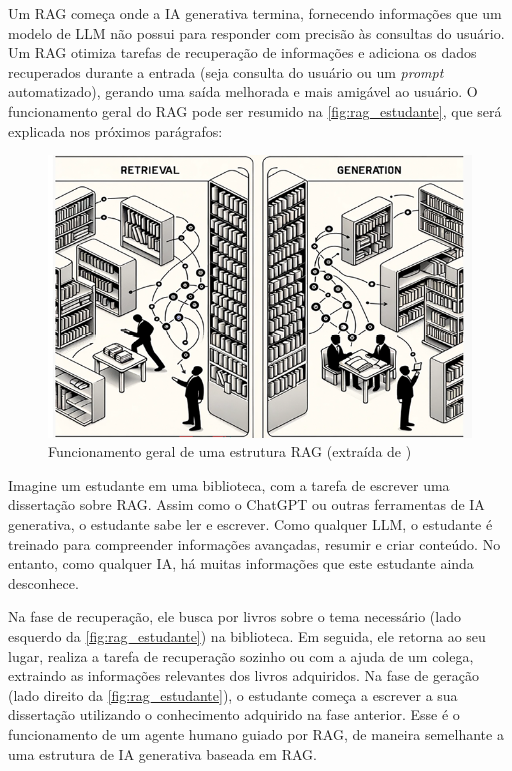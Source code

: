 \documentclass[a4paper, 12pt]{article}
\newcommand{\citeb}[1]{\bibleftbracket\cite{#1}\bibrightbracket}
\begin{document}
    Um RAG começa onde a IA generativa termina, fornecendo informações que um modelo de LLM não possui para responder com precisão às consultas do usuário. Um RAG otimiza tarefas de recuperação de informações e adiciona os dados recuperados durante a entrada (seja consulta do usuário ou um \textit{prompt} automatizado), gerando uma saída melhorada e mais amigável ao usuário. O funcionamento geral do RAG pode ser resumido na \autoref{fig:rag_estudante}, que será explicada nos próximos parágrafos:

    \begin{figure}[h]
        \includegraphics[width=\textwidth,height=0.9\textheight,keepaspectratio]{retrieval-generation-denis-rothman.png}
        \centering
        \caption{Funcionamento geral de uma estrutura RAG (extraída de \citeb{rothman})}
        \centering
        \label{fig:rag_estudante}
    \end{figure}

    Imagine um estudante em uma biblioteca, com a tarefa de escrever uma dissertação sobre RAG. Assim como o ChatGPT ou outras ferramentas de IA generativa, o estudante sabe ler e escrever. Como qualquer LLM, o estudante é treinado para compreender informações avançadas, resumir e criar conteúdo. No entanto, como qualquer IA, há muitas informações que este estudante ainda desconhece.

    Na fase de recuperação, ele busca por livros sobre o tema necessário (lado esquerdo da \autoref{fig:rag_estudante}) na biblioteca. Em seguida, ele retorna ao seu lugar, realiza a tarefa de recuperação sozinho ou com a ajuda de um colega, extraindo as informações relevantes dos livros adquiridos. Na fase de geração (lado direito da \autoref{fig:rag_estudante}), o estudante começa a escrever a sua dissertação utilizando o conhecimento adquirido na fase anterior. Esse é o funcionamento de um agente humano guiado por RAG, de maneira semelhante a uma estrutura de IA generativa baseada em RAG.
\end{document}
